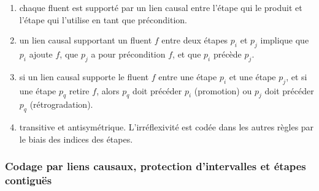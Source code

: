 {\begin{enumerate}
\item {} chaque fluent est supporté par un lien
  causal entre l'étape qui le produit et l'étape
  qui l'utilise en tant que précondition.
\item {} un lien causal supportant un fluent $f$ entre
  deux étapes $p_i$ et $p_j$ implique que $p_i$ ajoute $f$, que $p_j$ a pour
  précondition $f$, et que $p_i$ précède $p_j$.
\item {} si un lien causal supporte le
  fluent $f$ entre une étape $p_i$ et une étape $p_j$, et si une étape $p_q$
  retire $f$, alors $p_q$ doit précéder $p_i$ (promotion) ou $p_j$ doit précéder
  $p_q$ (rétrogradation).
\item {} transitive et
  antisymétrique. L'irréflexivité est codée dans les autres règles par le biais
  des indices des étapes.
\end{enumerate}

\subsubsection{Codage par liens causaux, protection d'intervalles et étapes contiguës}

}
